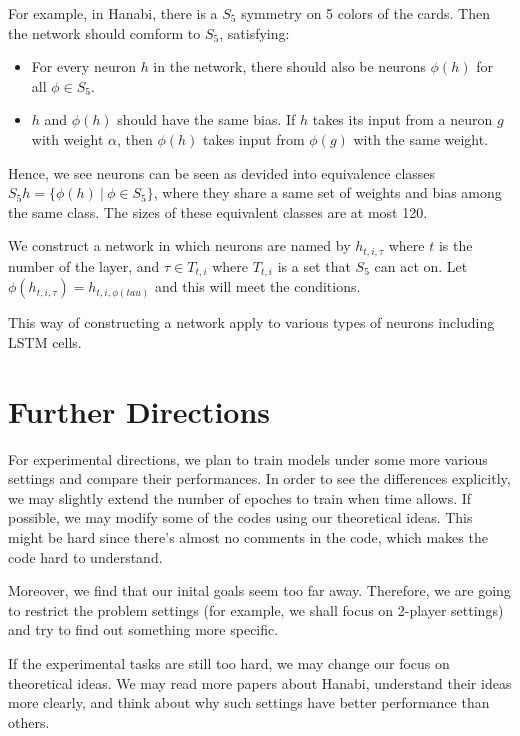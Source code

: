 \documentclass[12pt]{article}
\begin{document}
  For example, in Hanabi, there is a $S_5$ symmetry on 5 colors of the cards. Then the network should comform to $S_5$, satisfying:
  \begin{itemize}
	\item For every neuron $h$ in the network, there should also be neurons $\phi(h)$ for all $\phi\in S_5$.
	\item $h$ and $\phi(h)$ should have the same bias. If $h$ takes its input from a neuron $g$ with weight $\alpha$, then $\phi(h)$ takes input from $\phi(g)$ with the same weight.
  \end{itemize}

  Hence, we see neurons can be seen as devided into equivalence classes $S_5h = \{\phi(h)~|~\phi\in S_5\}$, where they share a same set of weights and bias among the same class. The sizes of these equivalent classes are at most 120.

  We construct a network in which neurons are named by $h_{t,i,\tau}$ where $t$ is the number of the layer, and $\tau\in T_{t,i}$ where $T_{t,i}$ is a set that $S_5$ can act on. Let $\phi(h_{t,i,\tau})=h_{t,i,\phi(tau)}$ and this will meet the conditions.

  This way of constructing a network apply to various types of neurons including LSTM cells.

\section{Further Directions}
For experimental directions, we plan to train models under some more various settings and compare their performances. In order to see the differences explicitly, we may slightly extend the number of epoches to train when time allows. If possible, we may modify some of the codes using our theoretical ideas. This might be hard since there's almost no comments in the code, which makes the code hard to understand.

Moreover, we find that our inital goals seem too far away. Therefore, we are going to restrict the problem settings (for example, we shall focus on 2-player settings) and try to find out something more specific.

If the experimental tasks are still too hard, we may change our focus on theoretical ideas. We may read more papers about Hanabi, understand their ideas more clearly, and think about why such settings have better performance than others.

\normalem


\end{document}
